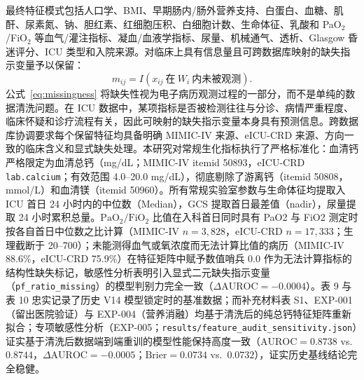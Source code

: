 \documentclass[11pt]{ctexart}
\begin{document}
最终特征模式包括人口学、BMI、早期肠内/肠外营养支持、白蛋白、血糖、肌酐、尿素氮、钠、胆红素、红细胞压积、白细胞计数、生命体征、乳酸和 PaO$_2$/FiO$_2$ 等血气/灌注指标、凝血/血液学指标、尿量、机械通气、透析、Glasgow 昏迷评分、ICU 类型和入院来源。对临床上具有信息量且可跨数据库映射的缺失指示变量予以保留：
\begin{equation}
m_{ij}=I(x_{ij}\ \text{在}\ W_i\ \text{内未被观测}).
\label{eq:missingness}
\end{equation}
公式~\ref{eq:missingness} 将缺失性视为电子病历观测过程的一部分，而不是单纯的数据清洗问题。在 ICU 数据中，某项指标是否被检测往往与分诊、病情严重程度、临床怀疑和诊疗流程有关，因此可映射的缺失指示变量本身具有预测信息。跨数据库协调要求每个保留特征均具备明确 MIMIC-IV 来源、eICU-CRD 来源、方向一致的临床含义和显式缺失处理。本研究对常规生化指标执行了严格标准化：血清钙严格限定为血清总钙（mg/dL；MIMIC-IV itemid 50893，eICU-CRD \texttt{lab.calcium}；有效范围 4.0--20.0 mg/dL），彻底剔除了游离钙（itemid 50808，mmol/L）和血清镁（itemid 50960）。所有常规实验室参数与生命体征均提取入 ICU 首日 24 小时内的中位数（Median），GCS 提取首日最差值（nadir），尿量提取 24 小时累积总量。$\mathrm{PaO_2/FiO_2}$ 比值在入科首日同时具有 PaO2 与 FiO2 测定时按各自首日中位数之比计算（MIMIC-IV $n = 3{,}828$，eICU-CRD $n = 17{,}333$；生理截断于 20--700）；未能测得血气或氧浓度而无法计算比值的病历（MIMIC-IV 88.6\%，eICU-CRD 75.9\%）在特征矩阵中赋予数值哨兵 0.0 作为无法计算指标的结构性缺失标记，敏感性分析表明引入显式二元缺失指示变量（\texttt{pf\_ratio\_missing}）的模型判别力完全一致（$\Delta\mathrm{AUROC} = -0.0004$）。表 9 与表 10 忠实记录了历史 V14 模型锁定时的基准数据；而补充材料表 S1、EXP-001（留出医院验证）与 EXP-004（营养消融）均基于清洗后的纯总钙特征矩阵重新拟合；专项敏感性分析（EXP-005；\texttt{results/feature\_audit\_sensitivity.json}）证实基于清洗后数据端到端重训的模型性能保持高度一致（$\text{AUROC} = 0.8738$ vs.\ $0.8744$，$\Delta\mathrm{AUROC} = -0.0005$；$\text{Brier} = 0.0734$ vs.\ $0.0732$），证实历史基线结论完全稳健。
\end{document}
